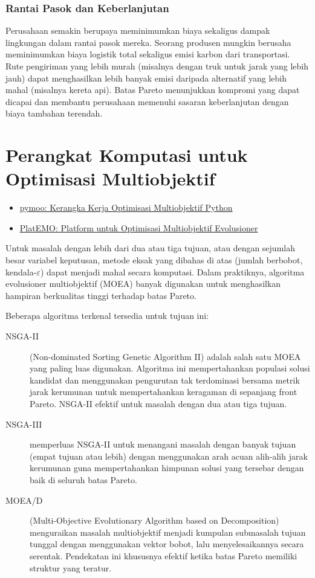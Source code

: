 \subsubsection{Rantai Pasok dan Keberlanjutan}
Perusahaan semakin berupaya meminimumkan biaya sekaligus dampak lingkungan dalam rantai pasok mereka. Seorang produsen mungkin berusaha meminimumkan biaya logistik total sekaligus emisi karbon dari transportasi. Rute pengiriman yang lebih murah (misalnya dengan truk untuk jarak yang lebih jauh) dapat menghasilkan lebih banyak emisi daripada alternatif yang lebih mahal (misalnya kereta api). Batas Pareto menunjukkan kompromi yang dapat dicapai dan membantu perusahaan memenuhi sasaran keberlanjutan dengan biaya tambahan terendah.

\section{Perangkat Komputasi untuk Optimisasi Multiobjektif}
\label{sec:moo-tools}

\begin{resource}
\begin{itemize}
\item \href{https://pymoo.org/}{pymoo: Kerangka Kerja Optimisasi Multiobjektif Python}
\item \href{https://platemo.com/}{PlatEMO: Platform untuk Optimisasi Multiobjektif Evolusioner}
\end{itemize}
\end{resource}

Untuk masalah dengan lebih dari dua atau tiga tujuan, atau dengan sejumlah besar variabel keputusan, metode eksak yang dibahas di atas (jumlah berbobot, kendala-$\varepsilon$) dapat menjadi mahal secara komputasi. Dalam praktiknya, algoritma evolusioner multiobjektif (MOEA) banyak digunakan untuk menghasilkan hampiran berkualitas tinggi terhadap batas Pareto.

Beberapa algoritma terkenal tersedia untuk tujuan ini:
\begin{description}
\item[NSGA-II] (Non-dominated Sorting Genetic Algorithm II) adalah salah satu MOEA yang paling luas digunakan. Algoritma ini mempertahankan populasi solusi kandidat dan menggunakan pengurutan tak terdominasi bersama metrik jarak kerumunan untuk mempertahankan keragaman di sepanjang front Pareto. NSGA-II efektif untuk masalah dengan dua atau tiga tujuan.
\item[NSGA-III] memperluas NSGA-II untuk menangani masalah dengan banyak tujuan (empat tujuan atau lebih) dengan menggunakan arah acuan alih-alih jarak kerumunan guna mempertahankan himpunan solusi yang tersebar dengan baik di seluruh batas Pareto.
\item[MOEA/D] (Multi-Objective Evolutionary Algorithm based on Decomposition) menguraikan masalah multiobjektif menjadi kumpulan submasalah tujuan tunggal dengan menggunakan vektor bobot, lalu menyelesaikannya secara serentak. Pendekatan ini khususnya efektif ketika batas Pareto memiliki struktur yang teratur.
\end{description}

